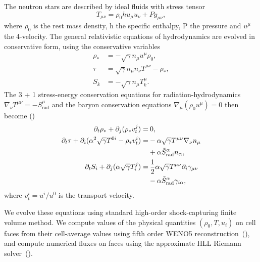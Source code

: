 The neutron stars are described by ideal fluids with stress tensor
\begin{equation}
T_{\mu\nu} = \rho_0 h u_\mu u_\nu + Pg_{\mu\nu},
\end{equation}
%
where $\rho_0$ is the rest mass density, h the specific enthalpy, P the pressure and $u^\mu$ the 4-velocity. The general relativistic equations of hydrodynamics are evolved in conservative form, using the conservative variables
%
\begin{align}
  \rho_* &= -\sqrt{\gamma}n_\mu u^\mu \rho_0, \\
  \tau &= \sqrt{\gamma}n_\mu n_\nu T^{\mu\nu} - \rho_*, \\
  S_k &= -\sqrt{\gamma}n_\mu T^\mu_k.
\end{align}
%
The 3 + 1 stress-energy conservation equations for radiation-hydrodynamics $\nabla_\nu T^{\mu\nu} = -S^\mu_\text{rad}$ and the baryon conservation equations $\nabla_\mu (\rho_0 u^\mu) = 0$ then become (\citet*{shibata2011truncated})
%
%
\begin{align}
  \partial_t \rho_* + \partial_j(\rho_* v_t^j) =&\:0, \\
  \partial_t \tau + \partial_i (\alpha^2 \sqrt{\gamma} T^{0i} - \rho_* v_t^i) =& -\alpha \sqrt{\gamma} T^{\mu\nu} \nabla_\nu n_\mu\\
  &+ \alpha \tilde S_\text{rad}^\alpha n_\alpha, \notag\\
  \partial_t S_i + \partial_j(\alpha\sqrt{\gamma}T^j_i) =&\: \frac{1}{2}\alpha \sqrt{\gamma} T^{\mu\nu} \partial_i \gamma_{\mu\nu} \\
  &- \alpha \tilde S_\text{rad}^\alpha \gamma_{i\alpha},\notag
\end{align}
%
where $v_t^i = u^i/u^0$ is the transport velocity.

We evolve these equations using standard high-order shock-capturing finite volume method. We compute values of the physical quantities $(\rho_0,T,u_i)$ on cell faces from their cell-average values using fifth order WENO5 reconstruction~(\citet*{borges}), and compute numerical fluxes on faces using the approximate HLL Riemann solver~(\citet*{hll}).

